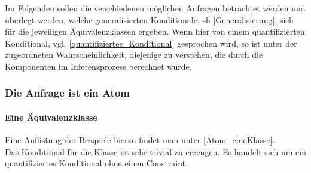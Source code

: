 \documentclass[draft]{scrreprt}
\begin{document}
Im Folgenden sollen die verschiedenen möglichen Anfragen betrachtet werden und überlegt werden, welche generalisierten Konditionale, sh \ref{Generalisierung},  sich für die jeweiligen Äquivalenzklassen ergeben. Wenn hier von einem quantifizierten Konditional, vgl. \ref{quantifiziertes_Konditional} gesprochen wird, so ist unter der zugeordneten Wahrscheinlichkeit, diejenige zu verstehen, die durch die Komponenten im Inferenzprozess berechnet wurde.
\subsubsection {Die Anfrage ist ein Atom} 
\paragraph{ Eine Äquivalenzklasse}
Eine Auflistung der Beispiele hierzu findet man unter \ref{Atom_eineKlasse}.\\
Das Konditional für die Klasse ist sehr trivial zu erzeugen. Es handelt sich um ein quantifiziertes Konditional ohne einen Constraint.
\end{document}
